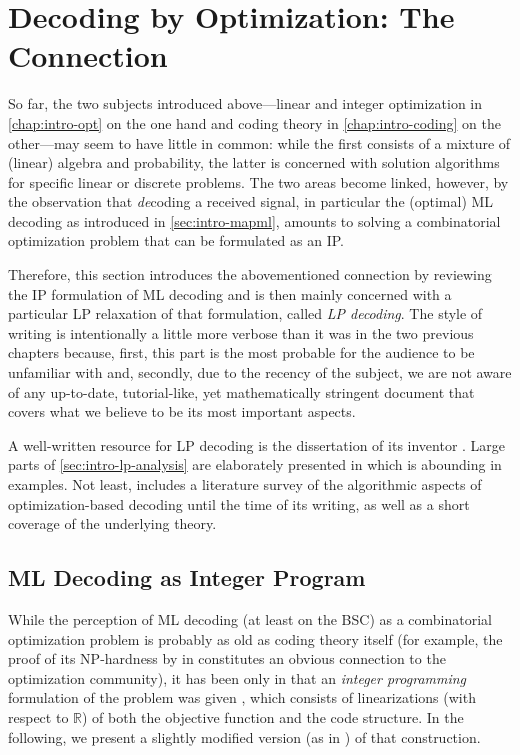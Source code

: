
\chapter{Decoding by Optimization: The Connection}
\label{chap:intro-optcoding}
So far, the two subjects introduced above—linear and integer optimization in \cref{chap:intro-opt} on the one hand and coding theory in \cref{chap:intro-coding} on the other—may seem to have little in common: while the first consists of a mixture of (linear) algebra and probability, the latter is concerned with solution algorithms for specific linear or discrete problems. The two areas become linked, however, by the observation that \emph{de}coding a received signal, in particular the (optimal) ML decoding as introduced in \cref{sec:intro-mapml}, amounts to solving a combinatorial optimization problem that can be formulated as an IP.

Therefore, this section introduces the abovementioned connection by reviewing the IP formulation of ML decoding and is then mainly concerned with a particular LP relaxation of that formulation, called \emph{LP decoding}. The style of writing is intentionally a little more verbose than it was in the two previous chapters because, first, this part is the most probable for the audience to be unfamiliar with and, secondly, due to the recency of the subject, we are not aware of any up-to-date, tutorial-like, yet mathematically stringent document that covers what we believe to be its most important aspects.

A well-written resource for LP decoding is the dissertation of its inventor \citeauthor*{Feldman03PhD} \cite{Feldman03PhD}. Large parts of \cref{sec:intro-lp-analysis} are elaborately presented in \cite{VontobelKoetter05GraphCover} which is abounding in examples. Not least, \cite{Helmling+11MathProgDecoding} includes a literature survey of the algorithmic aspects of optimization-based decoding until the time of its writing, as well as a short coverage of the underlying theory.

\section{ML Decoding as Integer Program}
\label{sec:intro-ml-ip}
While the perception of ML decoding (at least on the BSC) as a combinatorial optimization problem is probably as old as coding theory itself (for example, the proof of its \textsf{NP}-hardness by \citeauthor{Berlekamp+78IntractabilityCoding} in \citeyear{Berlekamp+78IntractabilityCoding} \cite{Berlekamp+78IntractabilityCoding} constitutes an obvious connection to the optimization community), it has been only in \citeyear{Breitbach+98SoftDecodingOpt} that an \emph{integer programming} formulation of the problem was given \cite{Breitbach+98SoftDecodingOpt}, which consists of linearizations (with respect to $ℝ$) of both the objective function and the code structure. In the following, we present a slightly modified version (as in \cite{Tanatmis+10SeparationAlgorithm}) of that construction.


